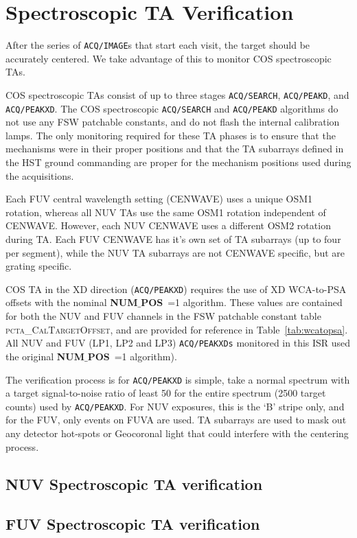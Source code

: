 \section{Spectroscopic TA Verification}\label{sec:spVER}

After the series of \texttt{ACQ/IMAGE}s that start each visit, the target should be accurately centered. We take advantage of this to monitor COS spectroscopic TAs.

COS spectroscopic TAs consist of up to three stages \texttt{ACQ/SEARCH}, \texttt{ACQ/PEAKD}, and \texttt{ACQ/PEAKXD}.
The COS spectroscopic \texttt{ACQ/SEARCH} and \texttt{ACQ/PEAKD} algorithms do not use any FSW patchable constants, and do not flash the
internal calibration lamps. The only monitoring required for these TA phases is to ensure that the mechanisms were in their proper
positions and that the TA subarrays defined in the HST ground commanding are proper for the mechanism positions used during the acquisitions.

Each FUV central wavelength setting (CENWAVE) uses a unique OSM1 rotation, whereas all NUV TAs use the same OSM1 rotation independent of CENWAVE.
However, each NUV CENWAVE uses a different OSM2 rotation during TA. Each FUV CENWAVE has it's own set of TA subarrays (up to four per segment), while the NUV TA subarrays are not CENWAVE
specific, but are grating specific.

COS TA in the XD direction (\texttt{ACQ/PEAKXD}) requires the use of XD WCA-to-PSA offsets with the nominal {{\bf NUM$\_$POS}\rm}~=1 algorithm.
These values are contained for both the NUV and FUV channels in the FSW patchable constant table \textsc{pcta\_CalTargetOffset}, and are provided for reference in Table~\ref{tab:wcatopsa}.
All NUV and FUV (LP1, LP2 and LP3) \texttt{ACQ/PEAKXDs} monitored in this ISR used the original {{\bf NUM$\_$POS}\rm}~=1 algorithm).

The verification process is for \texttt{ACQ/PEAKXD} is simple, take a normal spectrum with a target signal-to-noise ratio of least 50 for the entire spectrum (2500 target counts) used by \texttt{ACQ/PEAKXD}.
For NUV exposures, this is the `B' stripe only, and for the FUV, only events on FUVA are used.
TA subarrays are used to mask out any detector hot-spots or Geocoronal light that could interfere with the centering process.



\subsection{NUV Spectroscopic TA verification}\label{subsec:NspVER}
\subsection{FUV Spectroscopic TA verification}\label{subsec:FspVER}
